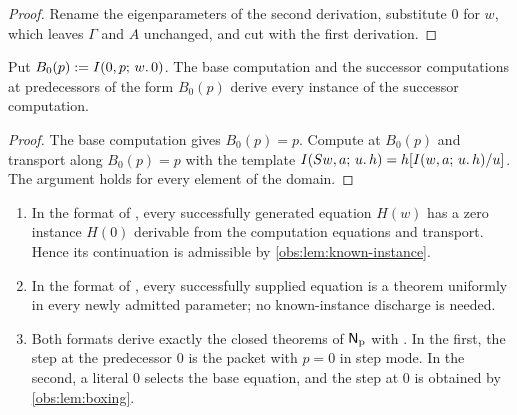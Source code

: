 \begin{proof}
Rename the eigenparameters of the second derivation, substitute $0$ for $w$,
which leaves $\Gamma$ and $A$ unchanged, and cut with the first derivation.
\end{proof}

\begin{lemma}
\label{obs:lem:boxing}
Put $B_0(p)\mathrel{:=}I(0,p;\,w.\,0)$. The base computation and the successor
computations at predecessors of the form $B_0(p)$ derive every instance of the
successor computation.
\end{lemma}

\begin{proof}
The base computation gives $B_0(p)=p$. Compute at $B_0(p)$ and transport along
$B_0(p)=p$ with the template
$I(S w,a;\,u.\,h)=h[I(w,a;\,u.\,h)/u]$. The argument holds for
every element of the domain.
\end{proof}

\begin{theorem}
\label{obs:thm:constructed-supply}
\begin{enumerate}[label=(\roman*)]
\item In the format of , every successfully
generated equation $H(w)$ has a zero instance $H(0)$ derivable from the
computation equations and transport. Hence its continuation is admissible by
\cref{obs:lem:known-instance}.
\item In the format of , every successfully supplied
equation is a theorem uniformly in every newly admitted parameter; no
known-instance discharge is needed.
\item Both formats derive exactly the closed theorems of $\mathsf{N}_{\mathrm{p}}$
with . In the first, the step at the predecessor $0$ is the
packet with $p=0$ in step mode. In the second, a literal $0$ selects the base
equation, and the step at $0$ is obtained by \cref{obs:lem:boxing}.
\end{enumerate}
\end{theorem}

